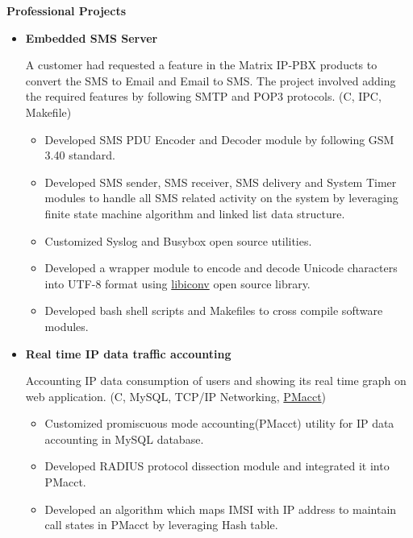 \documentclass[letterpaper,10pt]{article}
\newcommand{\resitem}[1]{\item #1 \vspace{-2pt}}
\newcommand{\resheading}[1]{{\large \colorbox{mygrey}{\begin{minipage}{\textwidth}{\textbf{#1 \vphantom{p\^{E}}}}\end{minipage}}}}
\begin{document}
\resheading{Professional Projects}
\begin{itemize}

\item
    \textbf{Embedded SMS Server}
    
    A customer had requested a feature in the Matrix IP-PBX products to convert the SMS to Email and Email to SMS. The project involved adding the required features by following SMTP and POP3 protocols. (C, IPC, Makefile)

	\begin{itemize}
		\resitem{Developed SMS PDU Encoder and Decoder module by following GSM 3.40 standard.}
		
		\resitem{Developed SMS sender, SMS receiver, SMS delivery and System Timer modules to handle all SMS related activity on the system by leveraging finite state machine algorithm and linked list data structure.}
	    
	    \resitem{Customized Syslog and Busybox open source utilities.}
	  
	    \resitem{Developed a wrapper module to encode and decode Unicode characters into UTF-8 format using \href{https://github.com/bnoordhuis/libiconv}{libiconv} open source library.}
        
        \resitem{Developed bash shell scripts and Makefiles to cross compile software modules.}
		
	\end{itemize}

\item
    \textbf{Real time IP data traffic accounting}
    
    Accounting IP data consumption of users and showing its real time graph on web application. (C, MySQL, TCP/IP Networking, \href{https://github.com/mehul-m-prajapati/pmacct}{PMacct})
    
	\begin{itemize}
	    \resitem{Customized promiscuous mode accounting(PMacct) utility for IP data accounting in MySQL database.}
	
	    \resitem{Developed RADIUS protocol dissection module and integrated it into PMacct.}
	    
	    \resitem{Developed an algorithm which maps IMSI with IP address to maintain call states in PMacct by leveraging Hash table.} 
	\end{itemize}
	

\end{itemize}
\end{document}
